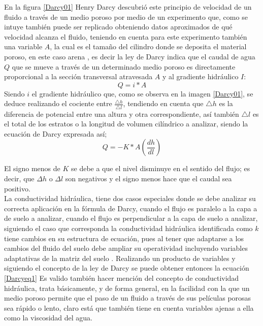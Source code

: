 En la figura \ref{Darcy01} Henry Darcy descubrió este principio de velocidad de un fluido a través de un medio poroso por medio de un experimento que, como se intuye también puede ser replicado obteniendo datos aproximados de qué velocidad alcanza el fluido, teniendo en cuenta para este experimento también una variable $A$, la cual es el tamaño del cilindro donde se deposita el material poroso, en este caso arena \parencite{del1993flujo}, es decir  la ley de Darcy  indica que el caudal de agua $Q$ que se mueve a través de un determinado medio poroso es directamente proporcional a la sección transversal atravesada $A$ y al gradiente hidráulico $I$:
\begin{equation}
	Q = i*A
\end{equation}
Siendo $i$ el gradiente hidráulico que, como se observa en la imagen \ref{Darcy01}, se deduce realizando el cociente entre $\frac{\bigtriangleup h}{\bigtriangleup l}$, tendiendo en cuenta que $\bigtriangleup h$ es la diferencia de potencial entre una altura y otra correspondiente, así también  $\bigtriangleup l$ es el total de los estratos o la longitud de volumen cilíndrico a analizar, siendo la ecuación de Darcy expresada así;
\begin{equation}
	Q = -K* A (\frac{dh}{dl})
	\label{Darcyequ9}
\end{equation}

El signo menos de $K$ se debe a que el nivel disminuye en el sentido del flujo; es decir, que $\varDelta{h}$ o $\varDelta{l}$ son negativos y el signo menos hace que el caudal sea positivo. \\

La conductividad hidráulica,  tiene dos casos especiales donde se debe analizar su correcta aplicación en la fórmula de Darcy, cuando el flujo es paralelo a la capa a de suelo a analizar,  cuando el flujo es perpendicular a la capa de suelo a analizar, siguiendo el caso que corresponda la conductividad hidráulica identificada como $k$ tiene cambios en su estructura de ecuación, pues al tener que adaptarse a los cambios del fluido del suelo debe ampliar su operatividad incluyendo variables adaptativas de la matriz del suelo \parencite{hurtado2001succion}. Realizando un producto de variables y siguiendo el concepto de la ley de Darcy se puede obtener entonces la ecuación \ref{Darcyeq1}  Es valido también hacer mención del concepto de conductividad hidráulica, trata básicamente, y de forma general, en la facilidad con la que un medio poroso permite que el paso de un fluido a través de sus películas porosas sea rápido o lento, claro está que también tiene en cuenta variables ajenas a ella como la viscosidad del agua.\\ 

